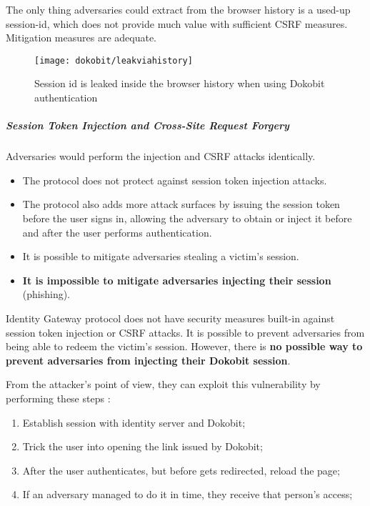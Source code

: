 The only thing adversaries could extract from the browser history is a used-up session-id, which does not provide much value with sufficient CSRF measures. Mitigation measures are adequate.

\begin{figure}
  \centering
  \texttt{[image: dokobit/leakviahistory]}
  \caption{Session id is leaked inside the browser history when using Dokobit authentication}
  \label{fig:dokobit-leakviahistory}
\end{figure}

\subparagraph{Session Token Injection and Cross-Site Request Forgery}

Adversaries would perform the injection and CSRF attacks identically.

\begin{itemize}
  \item The protocol does not protect against session token injection attacks.
  \item The protocol also adds more attack surfaces by issuing the session token before the user signs in, allowing the adversary to obtain or inject it before and after the user performs authentication.
  \item It is possible to mitigate adversaries stealing a victim's session.
  \item \textbf{It is impossible to mitigate adversaries injecting their session} (phishing).
\end{itemize}

Identity Gateway protocol does not have security measures built-in against session token injection or CSRF attacks. It is possible to prevent adversaries from being able to redeem the victim's session. However, there is \textbf{no possible way to prevent adversaries from injecting their Dokobit session}.

From the attacker's point of view, they can exploit this vulnerability by performing these steps \cite{video-exploitdokobit}:

\begin{enumerate}
  \item Establish session with identity server and Dokobit;
  \item Trick the user into opening the link issued by Dokobit;
  \item After the user authenticates, but before gets redirected, reload the page;
  \item If an adversary managed to do it in time, they receive that person's access;
\end{enumerate}

